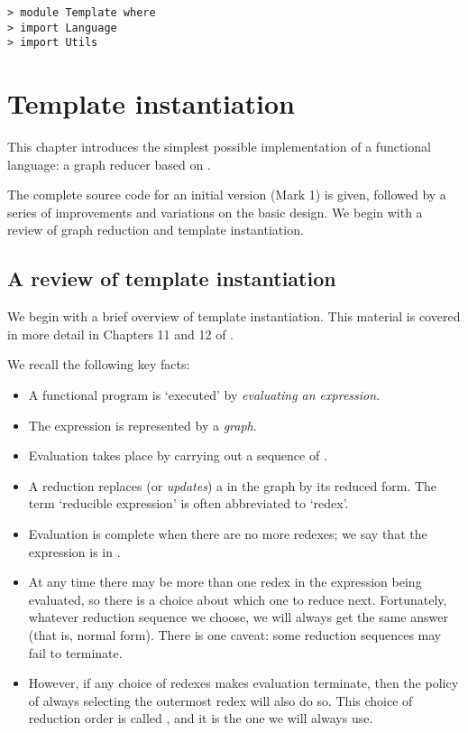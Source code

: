 \begin{verbatim}
> module Template where
> import Language
> import Utils
\end{verbatim}
%
%
%
\chapter{Template instantiation}
\label{sect:template}

This chapter introduces the simplest possible implementation of
a functional language: a graph reducer based
on .

The complete source code for an initial version (Mark 1) is given, followed
by a series of improvements and variations on the basic design.
We begin with a review of graph reduction and template instantiation.

\section{A review of template instantiation}

We begin with a brief overview of template instantiation.
This material is covered in more detail in
Chapters 11 and 12 of \cite{PJBook}.

We recall the following key facts:
\begin{itemize}
\item
A functional program is `executed' by {\em evaluating an expression}.
\item
The expression is represented by a {\em graph}.
\item
Evaluation takes place by carrying out a sequence of
.
\item
A reduction replaces (or {\em updates\/})
a 
 in the graph
by its reduced form. The term `reducible expression' is often
abbreviated to `redex'.
\item
Evaluation is complete when there are no more redexes; we say that the
expression is in .
\item
At any time there may be more than one redex in the expression being
evaluated, so there is a choice about which one to reduce next.
Fortunately, whatever reduction sequence we choose, we will always get the
same answer (that is, normal form).  There is one caveat: some reduction
sequences may fail to terminate.
\item
However, if
any choice of redexes makes evaluation terminate, then the policy of
always selecting the outermost redex will also do so.
This choice of reduction order is called
, and it is the one we will always use.
\end{itemize}


